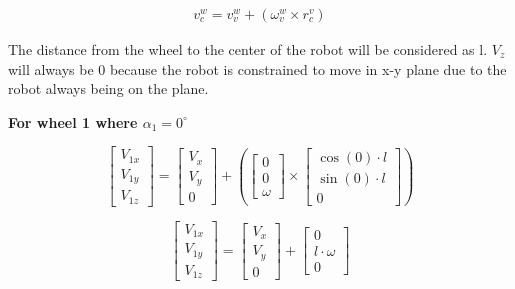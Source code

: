 \documentclass[answers]{exam}
\begin{document}
\begin{questions}
\begin{solution}
        \begin{align*}
            v^w_c = v^w_v + ({\omega}^w_v \times r^v_c)
        \end{align*}

        The distance from the wheel to the center of the robot will be considered as l.
        $V_z$ will always be 0 because the robot is constrained to move in x-y plane
        due to the robot always being on the plane.

        \textbf{For wheel 1 where $\alpha_1 = 0^\circ$}

        \begin{equation*}
            \begin{bmatrix}
                V_{1x} \\
                V_{1y} \\
                V_{1z}
            \end{bmatrix}
            = \begin{bmatrix}
                V_x \\
                V_y \\
                0
            \end{bmatrix}
            + \left(\begin{bmatrix}
                0 \\
                0 \\
                \omega
            \end{bmatrix} \times \begin{bmatrix}
                \cos(0) \cdot l \\
                \sin(0) \cdot l \\
                0
            \end{bmatrix}\right)
        \end{equation*}

        \begin{equation*}
            \begin{bmatrix}
                V_{1x} \\
                V_{1y} \\
                V_{1z}
            \end{bmatrix}
            = \begin{bmatrix}
                V_x \\
                V_y \\
                0
            \end{bmatrix}
            + \begin{bmatrix}
                0              \\
                l \cdot \omega \\
                0
            \end{bmatrix}
        \end{equation*}


\end{solution}
\end{questions}
\end{document}
